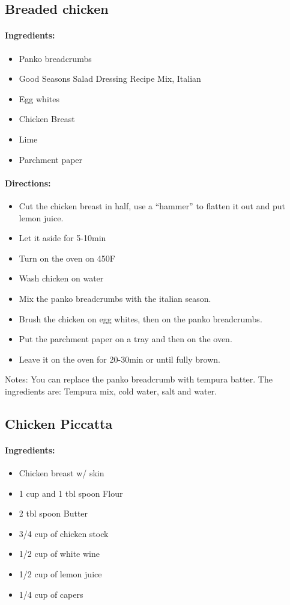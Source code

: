 \documentclass{article}
\begin{document}
\subsection{Breaded chicken}

\paragraph{Ingredients:}

\begin{itemize}
	\item Panko breadcrumbs
	\item Good Seasons Salad Dressing Recipe Mix, Italian
	\item Egg whites
	\item Chicken Breast
	\item Lime
	\item Parchment paper
\end{itemize}

\paragraph{Directions:}
\begin{itemize}
	\item Cut the chicken breast in half, use a “hammer” to flatten it out and put lemon juice.
	\item Let it aside for 5-10min
	\item Turn on the oven on 450F
	\item Wash chicken on water
	\item Mix the panko breadcrumbs with the italian season.
	\item Brush the chicken on egg whites, then on the panko breadcrumbs.
	\item Put the parchment paper on a tray and then on the oven.
	\item Leave it on the oven for 20-30min or until fully brown.
\end{itemize}

Notes: You can replace the panko breadcrumb with tempura batter. The ingredients are: Tempura mix, cold water, salt and water.


\subsection{Chicken Piccatta}

\paragraph{Ingredients:}
\begin{itemize}
	\item Chicken breast w/ skin
	\item 1 cup and 1 tbl spoon Flour
	\item 2 tbl spoon Butter
	\item 3/4 cup of chicken stock
	\item 1/2 cup of white wine
	\item 1/2 cup of lemon juice
	\item 1/4 cup of capers
\end{itemize}
\end{document}
